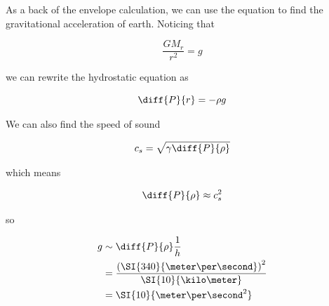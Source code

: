 As a back of the envelope calculation, we can use the equation to find the gravitational acceleration of earth. Noticing that

\begin{equation}
	\frac{GM_r}{r^2} = g
\end{equation}

we can rewrite the hydrostatic equation as

\begin{equation}
	\diff{P}{r} = -\rho g
\end{equation}

We can also find the speed of sound

\begin{equation}
	c_s = \sqrt{\gamma \diff{P}{\rho}}
\end{equation}

which means

\begin{equation}
	\diff{P}{\rho} \approx c_s^2
\end{equation}

so

\begin{align}
	g &\sim \diff{P}{\rho}\frac{1}{h}\\
	&= \frac{{(\SI{340}{\meter\per\second})}^2}{\SI{10}{\kilo\meter}}\\
	&= \SI{10}{\meter\per\second^2}
\end{align}